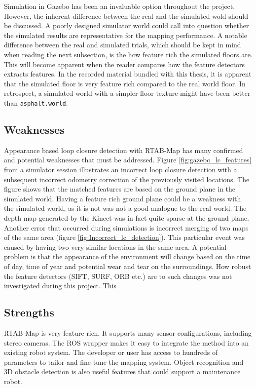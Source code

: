 Simulation in Gazebo has been an invaluable option throughout the project. However, the inherent difference between the real and the simulated wold should be discussed. A poorly designed simulator world could call into question whether the simulated results are representative for the mapping performance. A notable difference between the real and simulated trials, which should be kept in mind when reading the next subsection, is the how feature rich the simulated floors are. This will become apparent when the reader compares how the feature detectors extracts features. In the recorded material bundled with this thesis, it is apparent that the simulated floor is very feature rich compared to the real world floor. In retrospect, a simulated world with a simpler floor texture might have been better than \texttt{asphalt.world}.

\subsection{Weaknesses}

Appearance based loop closure detection with \ac{RTAB-Map} has many confirmed and potential weaknesses that must be addressed. Figure \ref{fig:gazebo_lc_features} from a simulator session illustrates an incorrect loop closure detection with a subsequent incorrect odometry correction of the previously visited locations. The figure shows that the matched features are based on the ground plane in the simulated world. Having a feature rich ground plane could be a weakness with the simulated world, as it is not was not a good analogue to the real world. The depth map generated by the Kinect was in fact quite sparse at the ground plane. Another error that occurred during simulations is incorrect merging of two maps of the same area (figure \ref{fig:Incorrect_lc_detection}). This particular event was caused by having two very similar locations in the same area. A potential problem is that the appearance of the environment will change based on the time of day, time of year and potential wear and tear on the surroundings. How robust the feature detectors (\ac{SIFT}, \ac{SURF}, \ac{ORB} etc.) are to such changes was not investigated during this project. This 

\subsection{Strengths}

\ac{RTAB-Map} is very feature rich. It supports many sensor configurations, including stereo cameras. The \ac{ROS} wrapper makes it easy to integrate the method into an existing robot system. The developer or user has access to hundreds of parameters to tailor and fine-tune the mapping system. Object recognition and 3D obstacle detection is also useful features that could support a maintenance robot.



